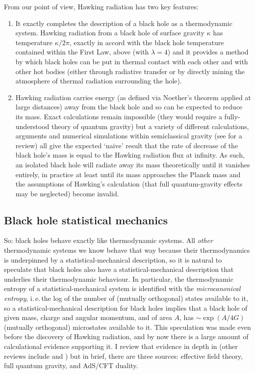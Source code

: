 \documentclass[12pt]{article}
\newcommand{\iec}{\mbox{i.\,e.\,}}
\begin{document}
From our point of view, Hawking radiation has two key features:
\begin{enumerate}
\item It exactly completes the description of a black hole as a thermodynamic system. Hawking radiation from a black hole of surface gravity $\kappa$ has temperature $\kappa/2\pi$, exactly in accord with the black hole temperature contained within the First Law, above (with $\lambda=4$) and it provides a method by which black holes can be put in thermal contact with each other and with other hot bodies (either through radiative transfer or by directly mining the atmosphere of thermal radiation surrounding the hole). 
\item Hawking radiation carries energy (as defined via Noether's theorem applied at large distances) away from the black hole and so can be expected to reduce its mass. Exact calculations remain impossible (they would require a fully-understood theory of quantum gravity) but a variety of different calculations, arguments and numerical simulations within semiclassical gravity (see  for a review) all give the expected `naive' result that the rate of decrease of the black hole's mass is equal to the Hawking radiation flux at infinity. As such, an isolated black hole will radiate away its mass theoretically until it vanishes entirely, in practice at least until its mass approaches the Planck mass and the assumptions of Hawking's calculation (that full quantum-gravity effects may be neglected) become invalid.
\end{enumerate}

\subsection{Black hole statistical mechanics}\label{black-hole-stat-mech}

So: black holes behave exactly like thermodynamic systems. All \emph{other} thermodynamic systems we know behave that way because their thermodynamics is underpinned by a statistical-mechanical description, so it is natural to speculate that black holes also have a statistical-mechanical description that underlies their thermodynamic behaviour. In particular, the thermodynamic entropy of a statistical-mechanical system is identified with the \emph{microcanonical entropy}, \iec the log of the number of (mutually orthogonal) states available to it, so a statistical-mechanical description for black holes implies that a black hole of given mass, charge and angular momentum, and of area $A$, has $\sim \exp(A/4G)$ (mutually orthogonal) microstates available to it. This speculation was made even before the discovery of Hawking radiation, and by now there is a large amount of calculational evidence supporting it. I review that evidence in depth in  (other reviews include  and )  but in brief, there are three sources: effective field theory, full quantum gravity, and AdS/CFT duality.
\end{document}

